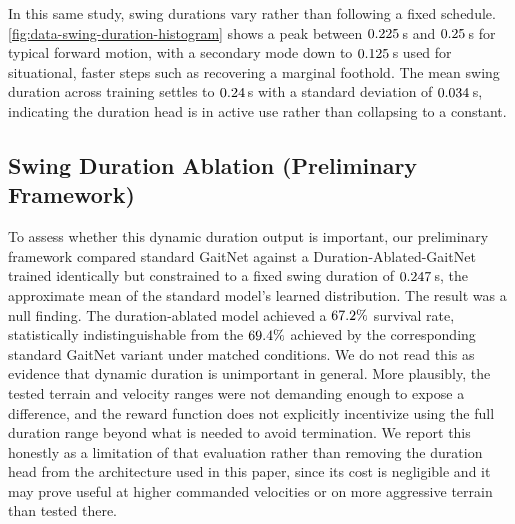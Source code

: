 In this same study, swing durations vary rather than following a
fixed schedule. \autoref{fig:data-swing-duration-histogram} shows a
peak between
$0.225$\,s and $0.25$\,s for typical
forward motion, with a secondary mode down to
$0.125$\,s used for situational, faster steps
such as recovering a marginal foothold. The mean swing duration
across training settles to $0.24$\,s with a
standard deviation of $0.034$\,s, indicating the
duration head is in active use rather than collapsing to a constant.

\subsection{Swing Duration Ablation (Preliminary Framework)}
\label{subsec:results-duration-ablation}

To assess whether this dynamic duration output is important, our
preliminary framework \cite{Sullivan2025} compared standard GaitNet
against a Duration-Ablated-GaitNet trained identically but constrained
to a fixed swing duration of $0.247$\,s,
the approximate mean of the standard model's learned distribution. The
result was a null finding. The duration-ablated model achieved a
$67.2\%$ survival rate, statistically
indistinguishable from the $69.4\%$ achieved by
the corresponding standard GaitNet variant under matched conditions. We
do not read this as evidence that dynamic duration is unimportant in
general. More plausibly, the tested terrain and velocity ranges were
not demanding enough to expose a difference, and the reward function
does not explicitly incentivize using the full duration range beyond
what is needed to avoid termination. We report this honestly as a
limitation of that evaluation rather than removing the duration head
from the architecture used in this paper, since its cost is negligible
and it may prove useful at higher commanded velocities or on more
aggressive terrain than tested there.
